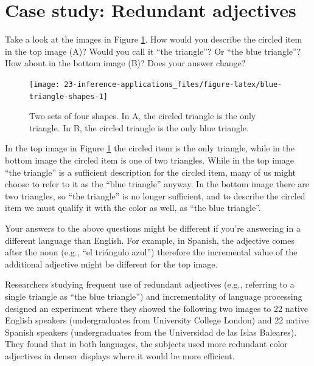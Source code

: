 \documentclass[
  10pt,
  openany]{book}
\begin{document}
\hypertarget{case-study-redundant-adjectives}{%
\section{Case study: Redundant adjectives}\label{case-study-redundant-adjectives}}

Take a look at the images in Figure \ref{fig:blue-triangle-shapes}.
How would you describe the circled item in the top image (A)?
Would you call it ``the triangle''?
Or ``the blue triangle''?
How about in the bottom image (B)?
Does your answer change?

\begin{figure}[h]

{\centering \texttt{[image: 23-inference-applications\_files/figure-latex/blue-triangle-shapes-1]} 

}

\caption{Two sets of four shapes. In A, the circled triangle is the only triangle. In B, the circled triangle is the only blue triangle.}\label{fig:blue-triangle-shapes}
\end{figure}

In the top image in Figure \ref{fig:blue-triangle-shapes} the circled item is the only triangle, while in the bottom image the circled item is one of two triangles.
While in the top image ``the triangle'' is a sufficient description for the circled item, many of us might choose to refer to it as the ``blue triangle'' anyway.
In the bottom image there are two triangles, so ``the triangle'' is no longer sufficient, and to describe the circled item we must qualify it with the color as well, as ``the blue triangle''.

Your answers to the above questions might be different if you're answering in a different language than English.
For example, in Spanish, the adjective comes after the noun (e.g., ``el triángulo azul'') therefore the incremental value of the additional adjective might be different for the top image.

Researchers studying frequent use of redundant adjectives (e.g., referring to a single triangle as ``the blue triangle'') and incrementality of language processing designed an experiment where they showed the following two images to 22 native English speakers (undergraduates from University College London) and 22 native Spanish speakers (undergraduates from the Universidad de las Islas Baleares).
They found that in both languages, the subjects used more redundant color adjectives in denser displays where it would be more efficient.
\citep{rubio-fernandez2021}
\end{document}
